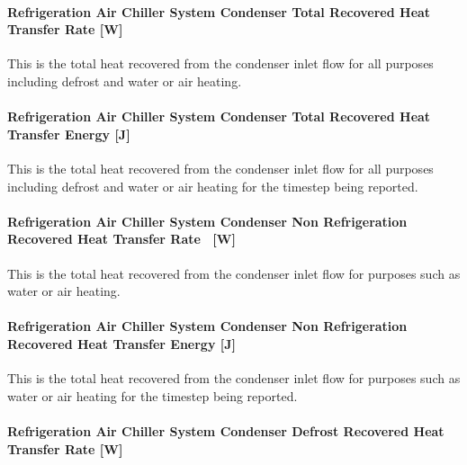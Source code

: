 \paragraph{Refrigeration Air Chiller System Condenser Total Recovered Heat Transfer Rate {[}W{]}}\label{refrigeration-air-chiller-system-condenser-total-recovered-heat-transfer-rate-w}

This is the total heat recovered from the condenser inlet flow for all purposes including defrost and water or air heating.

\paragraph{Refrigeration Air Chiller System Condenser Total Recovered Heat Transfer Energy {[}J{]}}\label{refrigeration-air-chiller-system-condenser-total-recovered-heat-transfer-energy-j}

This is the total heat recovered from the condenser inlet flow for all purposes including defrost and water or air heating for the timestep being reported.

\paragraph{Refrigeration Air Chiller System Condenser Non Refrigeration Recovered Heat Transfer Rate~ {[}W{]}}\label{refrigeration-air-chiller-system-condenser-non-refrigeration-recovered-heat-transfer-rate-w}

This is the total heat recovered from the condenser inlet flow for purposes such as water or air heating.

\paragraph{Refrigeration Air Chiller System Condenser Non Refrigeration Recovered Heat Transfer Energy {[}J{]}}\label{refrigeration-air-chiller-system-condenser-non-refrigeration-recovered-heat-transfer-energy-j}

This is the total heat recovered from the condenser inlet flow for purposes such as water or air heating for the timestep being reported.

\paragraph{Refrigeration Air Chiller System Condenser Defrost Recovered Heat Transfer Rate {[}W{]}}\label{refrigeration-air-chiller-system-condenser-defrost-recovered-heat-transfer-rate-w}

